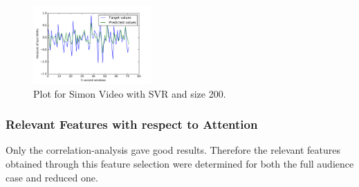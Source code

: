 \begin{figure}
\centering
\includegraphics[width=0.4\textwidth]{f4.pdf}
\caption{\label{fig:f4}Plot for Simon Video with SVR and size 200.}
\end{figure} 

\subsubsection{Relevant Features with respect to Attention}
Only the correlation-analysis gave good results. Therefore the relevant features obtained through this feature selection were determined for both the full audience case and reduced one.

